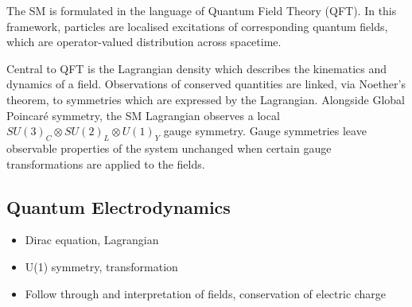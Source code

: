 The SM is formulated in the language of Quantum Field Theory (QFT).
In this framework, particles are localised excitations of corresponding quantum fields, which are operator-valued distribution across spacetime.

Central to QFT is the Lagrangian density which describes the kinematics and dynamics of a field.
Observations of conserved quantities are linked, via Noether's theorem, to symmetries which are expressed by the Lagrangian.
Alongside Global Poincar\'e symmetry, the SM Lagrangian observes a local $SU(3)_C \otimes SU(2)_L \otimes U(1)_Y$ gauge symmetry.
Gauge symmetries leave observable properties of the system unchanged when certain gauge transformations are applied to the fields.



\subsection{Quantum Electrodynamics}\label{sec:qed}

\begin{itemize}
  \item Dirac equation, Lagrangian
  \item U(1) symmetry, transformation
  \item Follow through and interpretation of fields, conservation of electric charge
\end{itemize}


